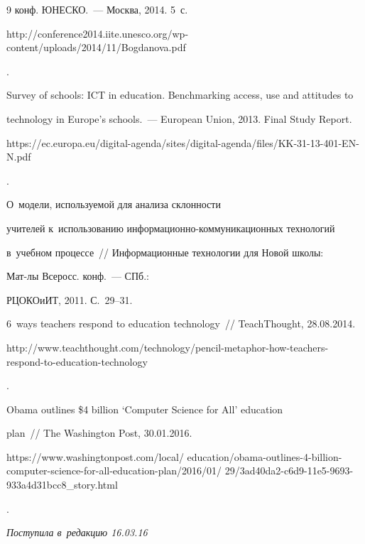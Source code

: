 {{\begin{thebibliography}{9}
конф. \mbox{ЮНЕСКО}.~--- Москва, 2014. 5~с. {\sf 


http://conference2014.iite.unesco.org/wp-content/uploads/2014/11/Bogdanova.pdf}.




Survey of schools: ICT in education. Benchmarking access, use and attitudes to 


technology in Europe's schools.~--- European Union, 2013.  Final Study Report. {\sf 


https://ec.europa.eu/digital-agenda/sites/digital-agenda/files/KK-31-13-401-EN-N.pdf}.




 О~модели, используемой для анализа склонности 


учителей к~использованию информационно-коммуникационных технологий 


в~учебном процессе~/\!\!/ Информационные технологии для Новой школы: 


Мат-лы Всеросс. конф.~--- СПб.: 


РЦОКОиИТ, 2011. С.~29--31.




6~ways teachers respond to education technology~/\!\!/ TeachThought, 28.08.2014. 


{\sf  


http://www.teachthought.com/technology/pencil-metaphor-how-teachers-respond-to-education-technology}.




 Obama outlines \$4 billion `Computer Science for All' education 


plan~/\!\!/ The Washington Post, 30.01.2016. {\sf 


https://www.washingtonpost.com/local/ education/obama-outlines-4-billion-computer-science-for-all-education-plan/2016/01/ 29/3ad40da2-c6d9-11e5-9693-933a4d31bcc8\_story.html}.





     \end{thebibliography}


} }








\vspace*{-3pt}





\hfill{\small\textit{Поступила в~редакцию 16.03.16}}














